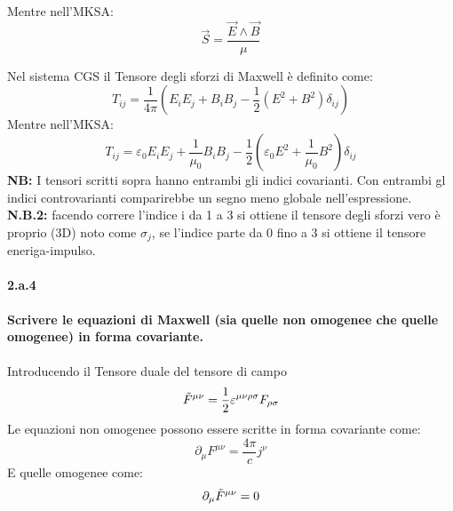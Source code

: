 \documentclass[twoside]{article}
\begin{document}
Mentre nell'MKSA:
\begin{equation*}
    \vec{S}=\frac{\vec{E}\wedge\vec{B}}{\mu}
\end{equation*}

Nel sistema CGS il Tensore degli sforzi di Maxwell è definito come:
\begin{equation*}
    T_{ij}=\frac{1}{4\pi}\left( E_i E_j + B_i B_j - \frac{1}{2}(E^2+B^2)\delta_{ij} \right)
\end{equation*}
Mentre nell'MKSA:
\begin{equation*}
    T_{ij}=\varepsilon_0E_i E_j+\frac{1}{\mu_0}B_iB_j-\frac{1}{2}\left(\varepsilon_0E^2+\frac{1}{\mu_0}B^2\right)\delta_{ij}
\end{equation*}
\textbf{NB:} I tensori scritti sopra hanno entrambi gli indici covarianti. Con entrambi gl indici controvarianti comparirebbe un segno meno globale nell'espressione. \\
\textbf{N.B.2:} facendo correre l'indice i da 1 a 3 si ottiene il tensore degli sforzi vero è proprio (3D) noto come $\sigma_j$, se l'indice parte da 0 fino a 3 si ottiene il tensore eneriga-impulso.


\paragraph{2.a.4}\textbf{Scrivere le equazioni di Maxwell (sia quelle non omogenee che quelle omogenee)
in forma covariante.}\\ \\
Introducendo il Tensore duale del tensore di campo 
\begin{equation}
    \Tilde{F}^{\mu \nu}=\frac{1}{2}\varepsilon^{\mu \nu \rho \sigma}F_{\rho \sigma}
\end{equation}
Le equazioni non omogenee possono essere scritte in forma covariante come:
\begin{equation}\label{non omogenea}
    \partial_{\mu}F^{\mu \nu}=\frac{4 \pi }{c}j^{\nu}
\end{equation}
E quelle omogenee come:
\begin{equation}
    \partial_{\mu}\Tilde{F}^{\mu \nu}=0
\end{equation}
\end{document}
